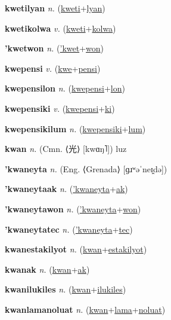 \textbf{\hypertarget{kwetilyan}{kwetilyan}} \textit{n.} (\hyperlink{kweti}{kweti}+\allowbreak \hyperlink{lyan}{lyan})


\textbf{\hypertarget{kwetikolwa}{kwetikolwa}} \textit{v.} (\hyperlink{kweti}{kweti}+\allowbreak \hyperlink{kolwa}{kolwa})


\textbf{\hypertarget{'kwetwon}{'kwetwon}} \textit{n.} (\hyperlink{'kwet}{'kwet}+\allowbreak \hyperlink{won}{won})


\textbf{\hypertarget{kwepensi}{kwepensi}} \textit{v.} (\hyperlink{kwe}{kwe}+\allowbreak \hyperlink{pensi}{pensi})


\textbf{\hypertarget{kwepensilon}{kwepensilon}} \textit{n.} (\hyperlink{kwepensi}{kwepensi}+\allowbreak \hyperlink{lon}{lon})


\textbf{\hypertarget{kwepensiki}{kwepensiki}} \textit{v.} (\hyperlink{kwepensi}{kwepensi}+\allowbreak \hyperlink{ki}{ki})


\textbf{\hypertarget{kwepensikilum}{kwepensikilum}} \textit{n.} (\hyperlink{kwepensiki}{kwepensiki}+\allowbreak \hyperlink{lum}{lum})


\textbf{\hypertarget{kwan}{kwan}} \textit{n.} (Cmn. ⟨{\chinese{}光}⟩ [kwɑŋ˥])
luz

\textbf{\hypertarget{'kwaneyta}{'kwaneyta}} \textit{n.} (Eng. ⟨Grenada⟩ [ɡɹʷəˈneɪ̯də])


\textbf{\hypertarget{'kwaneytaak}{'kwaneytaak}} \textit{n.} (\hyperlink{'kwaneyta}{'kwaneyta}+\allowbreak \hyperlink{ak}{ak})


\textbf{\hypertarget{'kwaneytawon}{'kwaneytawon}} \textit{n.} (\hyperlink{'kwaneyta}{'kwaneyta}+\allowbreak \hyperlink{won}{won})


\textbf{\hypertarget{'kwaneytatec}{'kwaneytatec}} \textit{n.} (\hyperlink{'kwaneyta}{'kwaneyta}+\allowbreak \hyperlink{tec}{tec})


\textbf{\hypertarget{kwanestakilyot}{kwanestakilyot}} \textit{n.} (\hyperlink{kwan}{kwan}+\allowbreak \hyperlink{estakilyot}{estakilyot})


\textbf{\hypertarget{kwanak}{kwanak}} \textit{n.} (\hyperlink{kwan}{kwan}+\allowbreak \hyperlink{ak}{ak})


\textbf{\hypertarget{kwanilukiles}{kwanilukiles}} \textit{n.} (\hyperlink{kwan}{kwan}+\allowbreak \hyperlink{ilukiles}{ilukiles})


\textbf{\hypertarget{kwanlamanoluat}{kwanlamanoluat}} \textit{n.} (\hyperlink{kwan}{kwan}+\allowbreak \hyperlink{lama}{lama}+\allowbreak \hyperlink{noluat}{noluat})


